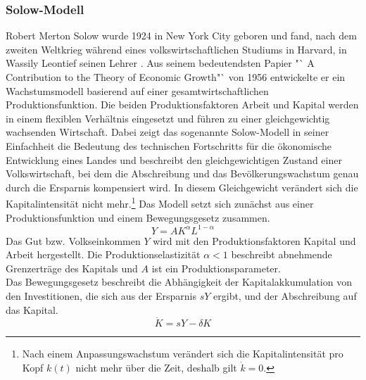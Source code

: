 \subsubsection*{Solow-Modell}
Robert Merton Solow wurde 1924 in New York City geboren und fand, nach dem zweiten Weltkrieg während eines volkswirtschaftlichen Studiums in Harvard, in Wassily Leontief seinen Lehrer \cite{Lin.2007}. Aus seinem bedeutendsten Papier "` A Contribution to the Theory of Economic Growth"` von 1956 entwickelte er ein Wachstumsmodell basierend auf einer gesamtwirtschaftlichen Produktionsfunktion. Die beiden Produktionsfaktoren Arbeit und Kapital werden in einem flexiblen Verhältnis eingesetzt und führen zu einer gleichgewichtig wachsenden Wirtschaft. Dabei zeigt das sogenannte Solow-Modell in seiner Einfachheit die Bedeutung des technischen Fortschritts für die ökonomische Entwicklung eines Landes und beschreibt den gleichgewichtigen Zustand einer Volkswirtschaft, bei dem die Abschreibung und das Bevölkerungswachstum genau durch die Ersparnis kompensiert wird. In diesem Gleichgewicht verändert sich die Kapitalintensität nicht mehr.\footnote{Nach einem Anpassungswachstum verändert sich die Kapitalintensität pro Kopf $k(t)$ nicht mehr über die Zeit, deshalb gilt $\dot{k}=0$.} Das Modell setzt sich zunächst aus einer Produktionsfunktion und einem Bewegungsgesetz zusammen.
%
	\begin{equation}
		Y=A K^\alpha L^{1-\alpha}
	\end{equation}
%
Das Gut bzw. Volkseinkommen $Y$ wird mit den Produktionsfaktoren Kapital und Arbeit hergestellt. Die Produktionselastizität $\alpha <1$ beschreibt abnehmende Grenzerträge des Kapitals und $A$ ist ein Produktionsparameter. \\ Das Bewegungsgesetz beschreibt die Abhängigkeit der Kapitalakkumulation von den Investitionen, die sich aus der Ersparnis $sY$ ergibt, und der Abschreibung auf das Kapital.
%
	\begin{equation}
		\dot{K}=sY-\delta K
	\end{equation}\label{Bewegungsgesetz Solow}
%
